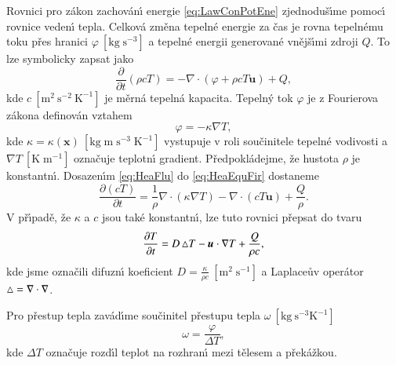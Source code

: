         Rovnici pro z\'{a}kon zachov\'{a}n\'{\i} energie \eqref{eq:LawConPotEne} zjednodu\v{s}\'{\i}me pomoc\'{\i} rovnice veden\'{\i} tepla. Celkov\'{a} zm\v{e}na tepeln\'{e} energie za \v{c}as je rovna tepeln\'{e}mu toku p\v{r}es hranici $\varphi \ [\mathrm{kg \; s^{-3}}]$ a tepeln\'{e} energii generovan\'{e} vn\v{e}j\v{s}\'{\i}mi zdroji $Q$. To lze symbolicky zapsat jako
        \begin{equation}
            \label{eq:HeaEquFir}
            \frac{\partial}{\partial t}\left(\rho c T\right) = - \nabla \cdot \left( \varphi + \rho  cT \boldsymbol{u} \right) + Q,
        \end{equation}
        kde $c \ [\mathrm{m}^{2} \ \mathrm{s}^{-2} \ \mathrm{K}^{-1}]$ je m\v{e}rn\'{a} tepeln\'{a} kapacita. Tepeln\'{y} tok $\varphi$ je z Fourierova z\'{a}kona definov\'{a}n vztahem 
        \begin{equation}
            \label{eq:HeaFlu}
            \varphi = - \kappa \nabla T,
        \end{equation}
        kde $\kappa = \kappa ( \boldsymbol{x}) \ [\mathrm{kg \; m \; s^{-3} \; K^{-1}}]$ vystupuje v roli sou\v{c}initele tepeln\'{e} vodivosti a $\nabla T \ [\mathrm{K \; m^{-1}}]$ ozna\v{c}uje teplotn\'{\i} gradient. P\v{r}edpokl\'{a}dejme, \v{z}e hustota $\rho$ je konstantn\'{\i}. Dosazen\'{\i}m \eqref{eq:HeaFlu} do \eqref{eq:HeaEquFir} dostaneme
        \begin{equation}
            \label{eq:HeaEqu1}
            \frac{\partial (cT)}{\partial t} = \frac{1}{\rho} \nabla \cdot ( \kappa \nabla T ) - \nabla \cdot ( cT \boldsymbol{u} ) + \frac{Q}{\rho}.
        \end{equation}
        V p\v{r}\'{\i}pad\v{e}, \v{z}e $\kappa$ a $c$ jsou tak\'{e} konstantn\'{\i}, lze tuto rovnici p\v{r}epsat do tvaru
        \begin{equation}
            \label{eq:HeaEqu}
            \frac{\partial T}{\partial t} = D \mathop{}\!\mathbin\bigtriangleup T - \boldsymbol{u}\cdot \nabla T + \frac{Q}{\rho c},
        \end{equation}
        kde jsme ozna\v{c}ili difuzn\'{\i} koeficient $D = \frac{\kappa}{\rho c} \ [\mathrm{m^{2} \; s^{-1}}]$ a Laplace\r{u}v oper\'{a}tor $\mathop{}\!\mathbin\bigtriangleup = \nabla \cdot \nabla$.
        
        Pro p\v{r}estup tepla zav\'{a}d\'{\i}me sou\v{c}initel p\v{r}estupu tepla $\omega \ [ \mathrm{kg \ s^{-3} K^{-1}}]$
        \begin{equation}
            \label{eq:TranCoef}
            \omega = \frac{\varphi}{\Delta T},
        \end{equation}
        kde $\Delta T$ ozna\v{c}uje rozd\'{\i}l teplot na rozhran\'{\i} mezi t\v{e}lesem a p\v{r}ek\'{a}\v{z}kou.

